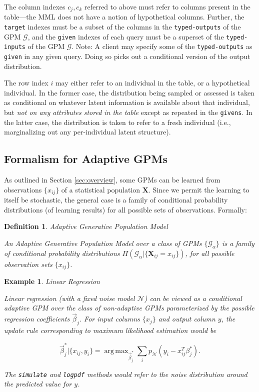 \documentclass[10pt,letterpaper]{article}
\newtheorem{example}{Example}[section]
\newtheorem{definition}{Definition}[section]
\DeclareMathOperator{\argmax}{arg\,max}
\newcommand{\G}{\mathcal{G}}
\begin{document}
The column indexes $c_j, c_k$ referred to above must refer to columns
present in the table---the MML does not have a notion of hypothetical
columns.  Further, the \texttt{target} indexes must be a subset of the
columns in the \texttt{typed-outputs} of the GPM $\G$, and
the \texttt{given} indexes of each query must be a superset of the
\texttt{typed-inputs} of the GPM $\G$.  Note: A client may
specify some of the \texttt{typed-outputs} as \texttt{given} in any
given query.  Doing so picks out a conditional version of the output
distribution.

The row index $i$ may either refer to an individual in the
table, or a hypothetical individual.  In the former case, the
distribution being sampled or assessed is taken as conditional on
whatever latent information is available about that individual, but
\emph{not on any attributes stored in the table} except as repeated in
the \texttt{givens}.  In the latter case, the distribution is taken to
refer to a fresh individual (i.e., marginalizing out any
per-individual latent structure).

\subsection{Formalism for Adaptive GPMs}

As outlined in Section \ref{sec:overview}, some GPMs can be learned
from observations $\{x_{ij}\}$ of a statistical population
$\mathbf{X}$.  Since we permit the learning to itself be stochastic,
the general case is a family of conditional probability distributions
(of learning results) for all possible sets of observations.  Formally:

\begin{definition} Adaptive Generative Population Model

An \emph{Adaptive Generative Population Model} over a class of GPMs
$\{\G_\alpha\}$ is a family of conditional probability distributions
$\Pi(\G_\alpha|\{\mathbf{X}_{ij} = x_{ij}\})$, for all possible
observation sets $\{x_{ij}\}$.
\end{definition}

\begin{example} Linear Regression

Linear regression (with a fixed noise model $\mathcal{N}$) can be viewed as a
conditional adaptive GPM over the class of non-adaptive GPMs
parameterized by the possible regression coefficients $\vec\beta_j$.
For input columns $\{x_j\}$ and output column $y$,
the update rule corresponding to maximum likelihood estimation would be

\[ \vec\beta_j^*|\{x_{ij}, y_i\} = \argmax_{\vec\beta_j^*} \sum_i p_{\mathcal{N}}(y_i - x_{ij}^T \beta_j^*). \]

The \texttt{simulate} and \texttt{logpdf} methods would refer to the
noise distribution around the predicted value for $y$.
\end{example}
\end{document}

